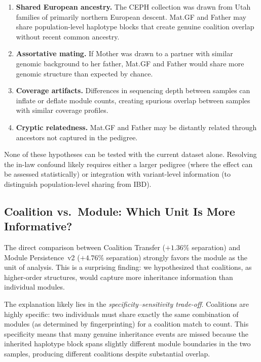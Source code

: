\documentclass{../yalumba}
\begin{document}
\begin{enumerate}
  \item \textbf{Shared European ancestry.}  The CEPH collection was drawn
        from Utah families of primarily northern European descent.  Mat.GF
        and Father may share population-level haplotype blocks that create
        genuine coalition overlap without recent common ancestry.
  \item \textbf{Assortative mating.}  If Mother was drawn to a partner with
        similar genomic background to her father, Mat.GF and Father would
        share more genomic structure than expected by chance.
  \item \textbf{Coverage artifacts.}  Differences in sequencing depth between
        samples can inflate or deflate module counts, creating spurious
        overlap between samples with similar coverage profiles.
  \item \textbf{Cryptic relatedness.}  Mat.GF and Father may be distantly
        related through ancestors not captured in the pedigree.
\end{enumerate}

None of these hypotheses can be tested with the current dataset alone.
Resolving the in-law confound likely requires either a larger pedigree (where
the effect can be assessed statistically) or integration with variant-level
information (to distinguish population-level sharing from IBD).

\subsection{Coalition vs.\ Module: Which Unit Is More Informative?}
\label{sec:discussion-unit}

The direct comparison between Coalition Transfer ($+1.36\%$ separation) and
Module Persistence~v2 ($+4.76\%$ separation) strongly favors the module as
the unit of analysis.  This is a surprising finding: we hypothesized that
coalitions, as higher-order structures, would capture more inheritance
information than individual modules.

The explanation likely lies in the \emph{specificity--sensitivity trade-off}.
Coalitions are highly specific: two individuals must share exactly the same
combination of modules (as determined by fingerprinting) for a coalition match
to count.  This specificity means that many genuine inheritance events are
missed because the inherited haplotype block spans slightly different module
boundaries in the two samples, producing different coalitions despite
substantial overlap.
\end{document}
